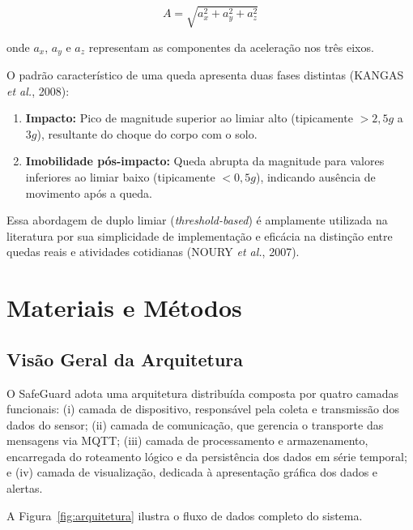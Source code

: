 \documentclass[a4paper,12pt]{article}
\begin{document}
\begin{equation}
\label{eq:magnitude}
A = \sqrt{a_x^2 + a_y^2 + a_z^2}
\end{equation}

\noindent onde $a_x$, $a_y$ e $a_z$ representam as componentes da aceleração nos três eixos.

O padrão característico de uma queda apresenta duas fases distintas (KANGAS \textit{et al.}, 2008):

\begin{enumerate}[leftmargin=2cm]
    \item \textbf{Impacto:} Pico de magnitude superior ao limiar alto (tipicamente $> 2{,}5g$ a $3g$), resultante do choque do corpo com o solo.
    \item \textbf{Imobilidade pós-impacto:} Queda abrupta da magnitude para valores inferiores ao limiar baixo (tipicamente $< 0{,}5g$), indicando ausência de movimento após a queda.
\end{enumerate}

Essa abordagem de duplo limiar (\textit{threshold-based}) é amplamente utilizada na literatura por sua simplicidade de implementação e eficácia na distinção entre quedas reais e atividades cotidianas (NOURY \textit{et al.}, 2007).

\section{Materiais e Métodos}

\subsection{Visão Geral da Arquitetura}

O SafeGuard adota uma arquitetura distribuída composta por quatro camadas funcionais: (i) camada de dispositivo, responsável pela coleta e transmissão dos dados do sensor; (ii) camada de comunicação, que gerencia o transporte das mensagens via MQTT; (iii) camada de processamento e armazenamento, encarregada do roteamento lógico e da persistência dos dados em série temporal; e (iv) camada de visualização, dedicada à apresentação gráfica dos dados e alertas.

A Figura~\ref{fig:arquitetura} ilustra o fluxo de dados completo do sistema.
\end{document}
